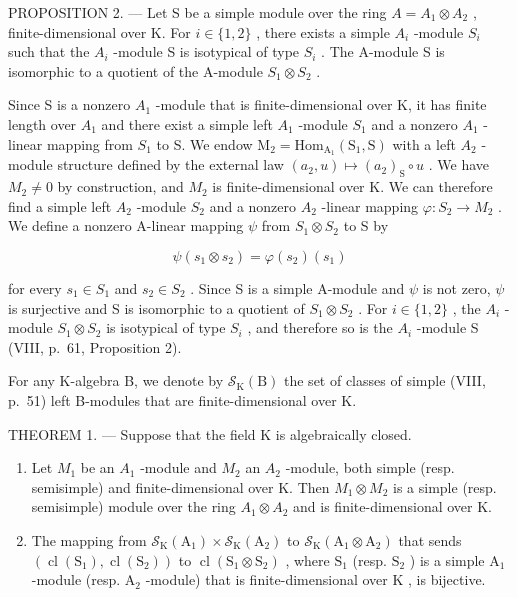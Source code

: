 PROPOSITION 2. --- Let S be a simple module over the ring \(A = A_{1} \otimes A_{2}\) , finite-dimensional over K. For \(i \in \{1, 2\}\) , there exists a simple \(A_{i}\) -module \(S_{i}\) such that the \(A_{i}\) -module S is isotypical of type \(S_{i}\) . The A-module S is isomorphic to a quotient of the A-module \(S_{1} \otimes S_{2}\) .

Since S is a nonzero \(A_{1}\) -module that is finite-dimensional over K, it has finite length over \(A_{1}\) and there exist a simple left \(A_{1}\) -module \(S_{1}\) and a nonzero \(A_{1}\) -linear mapping from \(S_{1}\) to S. We endow \(\mathrm{M}_{2} = \mathrm{Hom}_{\mathrm{A}_{1}}(\mathrm{S}_{1}, \mathrm{S})\) with a left \(A_{2}\) -module structure defined by the external law \((a_{2}, u) \mapsto (a_{2})_{\mathrm{S}} \circ u\) . We have \(M_{2} \neq 0\) by construction, and \(M_{2}\) is finite-dimensional over K. We can therefore find a simple left \(A_{2}\) -module \(S_{2}\) and a nonzero \(A_{2}\) -linear mapping \(\varphi : S_{2} \to M_{2}\) . We define a nonzero A-linear mapping \(\psi\) from \(S_{1} \otimes S_{2}\) to S by

\[
\psi (s _ {1} \otimes s _ {2}) = \varphi (s _ {2}) (s _ {1})\tag{1}
\]

for every \(s_{1} \in S_{1}\) and \(s_{2} \in S_{2}\) . Since S is a simple A-module and \(\psi\) is not zero, \(\psi\) is surjective and S is isomorphic to a quotient of \(S_{1} \otimes S_{2}\) . For \(i \in \{1, 2\}\) , the \(A_{i}\) -module \(S_{1} \otimes S_{2}\) is isotypical of type \(S_{i}\) , and therefore so is the \(A_{i}\) -module S (VIII, p.~61, Proposition 2).

For any K-algebra B, we denote by \(\mathcal{S}_{\mathrm{K}}(\mathrm{B})\) the set of classes of simple (VIII, p.~51) left B-modules that are finite-dimensional over K.

THEOREM 1. --- Suppose that the field K is algebraically closed.

\begin{enumerate}
\def\labelenumi{\alph{enumi})}
\item
  Let \(M_{1}\) be an \(A_{1}\) -module and \(M_{2}\) an \(A_{2}\) -module, both simple (resp. semisimple) and finite-dimensional over K. Then \(M_{1} \otimes M_{2}\) is a simple (resp. semisimple) module over the ring \(A_{1} \otimes A_{2}\) and is finite-dimensional over K.
\item
  The mapping from \(\mathcal{S}_{\mathrm{K}}(\mathrm{A}_1)\times \mathcal{S}_{\mathrm{K}}(\mathrm{A}_2)\) to \(\mathcal{S}_{\mathrm{K}}(\mathrm{A}_1\otimes \mathrm{A}_2)\) that sends \((\operatorname {cl}(\mathrm{S}_1),\operatorname {cl}(\mathrm{S}_2))\) to \(\operatorname {cl}(\mathrm{S}_1\otimes \mathrm{S}_2)\) , where \(\mathrm{S}_1\) (resp. \(\mathrm{S}_2\) ) is a simple \(\mathrm{A}_1\) -module (resp. \(\mathrm{A}_2\) -module) that is finite-dimensional over \(\mathrm{K}\) , is bijective.
\end{enumerate}

